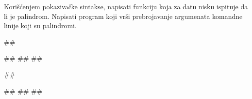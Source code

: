 \begin{Exercise}[label=305]
Korišćenjem pokazivačke sintakse, napisati funkciju koja
za datu nisku ispituje da li je palindrom. Napisati program koji
vrši prebrojavanje argumenata komandne linije koji su
palindromi.

\begin{miditest}
\begin{upotreba}{1}
##

#\naslovInt#
##
##
\end{upotreba}
\end{miditest}
\begin{miditest}
\begin{upotreba}{2}
##

#\naslovInt#
##
##
\end{upotreba}
\end{miditest}

\end{Exercise}
\begin{Answer}[ref=305]
\end{Answer}

